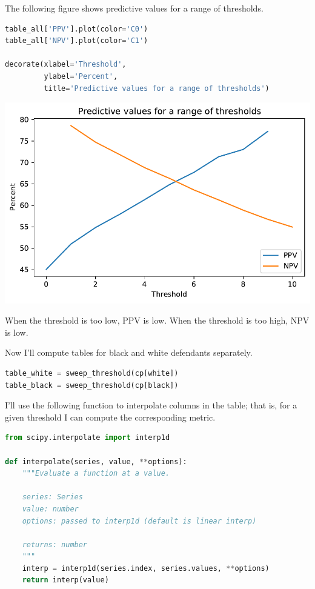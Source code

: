 The following figure shows predictive values for a range of thresholds.

\begin{lstlisting}[language=Python,style=source]
table_all['PPV'].plot(color='C0')
table_all['NPV'].plot(color='C1')

decorate(xlabel='Threshold', 
         ylabel='Percent',
         title='Predictive values for a range of thresholds')
\end{lstlisting}

\begin{center}
\includegraphics[scale=0.75]{02_calibration_files/02_calibration_39_0.pdf}
\end{center}

When the threshold is too low, PPV is low. When the threshold is too
high, NPV is low.

Now I'll compute tables for black and white defendants separately.

\begin{lstlisting}[language=Python,style=source]
table_white = sweep_threshold(cp[white])
table_black = sweep_threshold(cp[black])
\end{lstlisting}

I'll use the following function to interpolate columns in the table;
that is, for a given threshold I can compute the corresponding metric.

\begin{lstlisting}[language=Python,style=source]
from scipy.interpolate import interp1d

def interpolate(series, value, **options):
    """Evaluate a function at a value.
    
    series: Series
    value: number
    options: passed to interp1d (default is linear interp)
    
    returns: number
    """
    interp = interp1d(series.index, series.values, **options)
    return interp(value)
\end{lstlisting}

